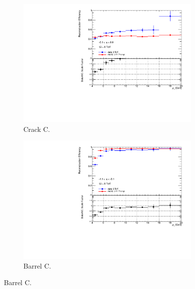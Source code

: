 \begin{figure}[htbp]
  \centering
  \begin{subfigure}[b]{0.45\textwidth}
    \includegraphics[width=\textwidth]{PartCalibration2012/Plots/SFPlots/Crack_C_reco.pdf}
    \caption{Crack C.} \label{fig:CalibrationRecoSFCrackC}
  \end{subfigure}
  \hfill
  \begin{subfigure}[b]{0.45\textwidth}
    \includegraphics[width=\textwidth]{PartCalibration2012/Plots/SFPlots/Barrel_C_reco.pdf}
    \caption{Barrel C.} \label{fig:CalibrationRecoSFBarrelC}
  \end{subfigure}


\end{figure}
